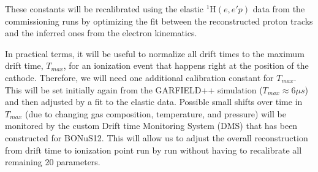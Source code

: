 \documentclass[12pt]{article}
\begin{document}
 
These constants
will be recalibrated using the elastic 
      $^1$H$(e,e'p)$  data from the commissioning runs by optimizing the fit between 
the reconstructed proton tracks and the inferred ones from the electron kinematics.

In practical terms, it will be useful to normalize all drift times to the maximum drift time,
$T_{max}$, for an ionization event that happens right at the position of the cathode. Therefore,
we will need one additional calibration constant for $T_{max}$. This will be set
initially again from the GARFIELD++ simulation ($T_{max} \approx 6 \mu s$) and then 
adjusted by a fit to the elastic data. Possible small shifts over time in  $T_{max}$ 
(due to changing gas composition, temperature, and pressure) will be monitored
by the custom Drift time Monitoring System (DMS) that has been constructed for BONuS12.
This will allow us to adjust the overall reconstruction from drift time to ionization point run by run
without having to recalibrate all remaining 20 parameters.
\end{document}
